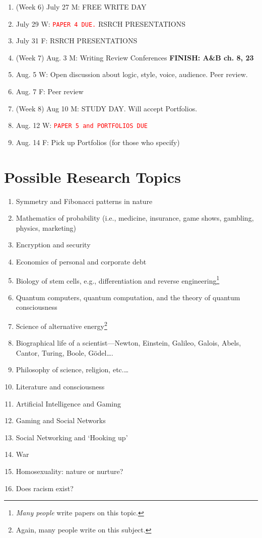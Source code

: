 \documentclass [11pt]{article}
\begin{document}
\begin{enumerate}
\item (Week 6) July 27 M: FREE WRITE DAY
\item[] July 29 W: \textcolor{red}{\texttt{PAPER 4 DUE.}} RSRCH PRESENTATIONS
\item[] July 31 F: RSRCH PRESENTATIONS

\item (Week 7) Aug. 3 M: Writing Review Conferences {\bf FINISH: A\&B ch. 8, 23} 
\item[] Aug. 5 W:  Open discussion about logic, style, voice, audience. Peer review. 
\item[] Aug. 7 F:  Peer review

\item (Week 8) Aug 10 M: STUDY DAY. Will accept Portfolios.
\item[] Aug. 12 W: \textcolor{red}{\texttt{PAPER 5 and PORTFOLIOS DUE}}
\item[] Aug. 14 F: Pick up Portfolios (for those who specify)
\end{enumerate}


\section{Possible Research Topics}
\begin{enumerate}
\item Symmetry and Fibonacci patterns in nature
\item Mathematics of probability (i.e., medicine, insurance, game shows, gambling, physics, marketing)
\item Encryption and security
\item Economics of personal and corporate debt
\item Biology of stem cells, e.g., differentiation and reverse engineering\footnote{\emph{Many people} write papers on this topic.}
\item Quantum computers, quantum computation, and the theory of quantum consciousness
\item Science of alternative energy\footnote{Again, many people write on this subject.}
\item Biographical life of a scientist---Newton, Einstein, Galileo, Galois, Abels, Cantor, Turing, Boole, G\"odel\ldots{}.
\item Philosophy of science, religion, etc.\ldots
\item Literature and consciousness
\item Artificial Intelligence and Gaming
\item Gaming and Social Networks
\item Social Networking and `Hooking up'
\item War
\item Homosexuality: nature or nurture?
\item Does racism exist?
\end{enumerate}
\end{document}
